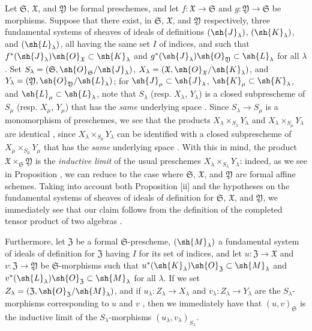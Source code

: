\begin{env}[10.7.4]
\label{I.10.7.4}
Let $\mathfrak{S}$, $\mathfrak{X}$, and $\mathfrak{Y}$ be formal preschemes, and let $f:\mathfrak{X}\to\mathfrak{S}$ and $g:\mathfrak{Y}\to\mathfrak{S}$ be morphisms.
Suppose that there exist, in $\mathfrak{S}$, $\mathfrak{X}$, and $\mathfrak{Y}$ respectively, three fundamental systems of sheaves of ideals of definitions $(\sh{J}_\lambda)$, $(\sh{K}_\lambda)$, and $(\sh{L}_\lambda)$, all having the same set $I$ of indices, and such that $f^*(\sh{J}_\lambda)\sh{O}_\mathfrak{X}\subset\sh{K}_\lambda$ and $g^*(\sh{J}_\lambda)\sh{O}_\mathfrak{Y}\subset\sh{L}_\lambda$ for all $\lambda$.
Set $S_\lambda=(\mathfrak{S},\sh{O}_\mathfrak{S}/\sh{J}_\lambda)$, $X_\lambda=(\mathfrak{X},\sh{O}_\mathfrak{X}/\sh{K}_\lambda)$, and $Y_\lambda=(\mathfrak{Y},\sh{O}_\mathfrak{Y}/\sh{L}_\lambda)$; for $\sh{J}_\mu\subset\sh{J}_\lambda$, $\sh{K}_\mu\subset\sh{K}_\lambda$, and $\sh{L}_\mu\subset\sh{L}_\lambda$, note that $S_\lambda$ (resp. $X_\lambda$, $Y_\lambda$) is a closed subprescheme of $S_\mu$ (resp. $X_\mu$, $Y_\mu$) that has the \emph{same}
underlying space .
Since $S_\lambda\to S_\mu$ is a monomorphism of preschemes, we see that the products $X_\lambda\times_{S_\lambda}Y_\lambda$ and $X_\lambda\times_{S_\mu}Y_\lambda$ are identical , since $X_\lambda\times_{S_\mu}Y_\lambda$ can be identified with a closed subprescheme of $X_\mu\times_{S_\mu}Y_\mu$ that has the \emph{same} underlying space .
With this in mind, the product $\mathfrak{X}\times_\mathfrak{S}\mathfrak{Y}$ is the \emph{inductive limit} of the usual preschemes $X_\lambda\times_{S_\lambda}Y_\lambda$: indeed, as we see in Proposition , we can reduce to the case where $\mathfrak{S}$, $\mathfrak{X}$, and $\mathfrak{Y}$ are formal affine schemes.
Taking into account both Proposition [ii] and the hypotheses on the fundamental systems of sheaves of ideals of definition for $\mathfrak{S}$, $\mathfrak{X}$, and $\mathfrak{Y}$, we immediately see that our claim follows from the definition of the completed tensor product of two algebras .

Furthermore, let $\mathfrak{Z}$ be a formal $\mathfrak{S}$-prescheme, $(\sh{M}_\lambda)$ a fundamental system of ideals of definition for $\mathfrak{Z}$ having $I$ for its set of indices, and let $u:\mathfrak{Z}\to\mathfrak{X}$ and $v:\mathfrak{Z}\to\mathfrak{Y}$ be $\mathfrak{S}$-morphisms such that $u^*(\sh{K}_\lambda)\sh{O}_\mathfrak{Z}\subset\sh{M}_\lambda$ and $v^*(\sh{L}_\lambda)\sh{O}_\mathfrak{Z}\subset\sh{M}_\lambda$ for all $\lambda$.
If we set $Z_\lambda=(\mathfrak{Z},\sh{O}_\mathfrak{Z}/\sh{M}_\lambda)$, and if $u_\lambda:Z_\lambda\to X_\lambda$ and $v_\lambda:Z_\lambda\to Y_\lambda$ are the $S_\lambda$-morphisms corresponding to $u$ and $v$ , then we immediately have that $(u,v)_\mathfrak{S}$ is the inductive limit of the $S_\lambda$-morphisms $(u_\lambda,v_\lambda)_{S_\lambda}$.


\end{env}
